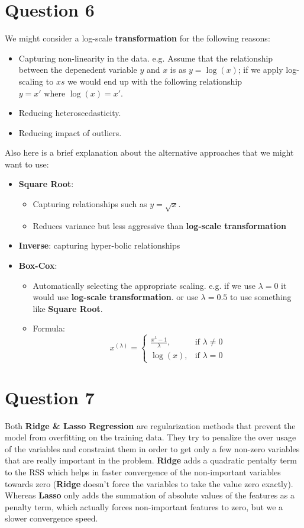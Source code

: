 \documentclass[a4paper,12pt]{article}
\begin{document}
\section*{Question 6}
We might consider a log-scale \textbf{transformation} for the following reasons:
\begin{itemize}
    \item Capturing non-linearity in the data. e.g. Assume that the relationship between the depenedent variable $ y $ and $ x $ is as $ y = \log(x) $; if we apply log-scaling to $ xs $ 
    we would end up with the following relationship $ y = x' \text{ where } \log(x) = x'$.
    \item Reducing heteroscedasticity.
    \item Reducing impact of outliers. 
\end{itemize}
Also here is a brief explanation about the alternative approaches that we might want to use:
\begin{itemize}
    \item \textbf{Square Root}:
    \begin{itemize}
        \item Capturing relationships such as $ y = \sqrt{x} $.
        \item Reduces variance but less aggressive than \textbf{log-scale transformation}
    \end{itemize}
    \item \textbf{Inverse}: capturing hyper-bolic relationships
    \item \textbf{Box-Cox}:
    \begin{itemize}
        \item Automatically selecting the appropriate scaling. e.g. if we use $ \lambda = 0 $ it would use \textbf{log-scale transformation}. or use $ \lambda = 0.5 $ to use something like \textbf{Square Root}.
        \item Formula:
        \[
        x^{(\lambda)} =
        \begin{cases}
        \displaystyle \frac{x^\lambda - 1}{\lambda}, & \text{if } \lambda \ne 0 \\
        \log(x), & \text{if } \lambda = 0
        \end{cases}
        \]
    \end{itemize}
\end{itemize}

\section*{Question 7}
Both \textbf{Ridge \& Lasso Regression} are regularization methods that prevent the model from overfitting on the training data. They try to penalize the over usage of the 
variables and constraint them in order to get only a few non-zero variables that are really important in the problem. \textbf{Ridge} adds a quadratic pentalty term to the RSS
which helps in faster convergence of the non-important variables towards zero (\textbf{Ridge} doesn't force the variables to take the value zero exactly). Whereas \textbf{Lasso} 
only adds the summation of absolute values of the features as a penalty term, which actually forces non-important features to zero, but we a slower convergence speed.
\end{document}
